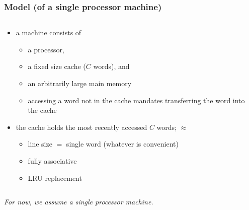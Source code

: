 \documentclass[12pt,dvipdfmx]{beamer}
\newcommand{\aka}[1]{{\color{red}#1}}
\begin{document}
\begin{frame}
\frametitle{Model (of a single processor machine)}

\begin{columns}
\begin{column}{0.6\textwidth}
\begin{itemize}
\item<1-> a machine consists of 
  \begin{itemize}
  \item a processor,
  \item a fixed size cache ($C$ words), and
  \item an arbitrarily large main memory
  \item accessing a word not in the cache mandates 
    transferring the word into the cache
  \end{itemize}

\item<2-> the cache holds the most recently accessed
  $C$ words; $\approx$
  \begin{itemize}
  \item line size $=$ single word (whatever is convenient)
  \item fully associative
  \item LRU replacement
  \end{itemize}
\end{itemize}

\end{column}

\begin{column}{0.4\textwidth}
\begin{center}
\def\svgwidth{\textwidth}
{\scriptsize }
\end{center}
\end{column}  
\end{columns}

\begin{center}
\aka{\em For now, we assume a single processor machine.}
\end{center}
\end{frame}
\end{document}
